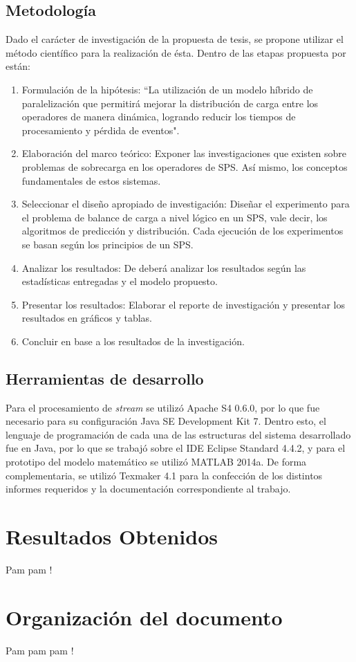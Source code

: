 \subsection{Metodología}
Dado el carácter de investigación de la propuesta de tesis, se propone utilizar el método científico para la realización de ésta. Dentro de las etapas propuesta por \citep{hernandez2010metodologia} están:

\begin{enumerate}
	\item Formulación de la hipótesis: ``La utilización de un modelo híbrido de paralelización que permitirá mejorar la distribución de carga entre los operadores de manera dinámica, logrando reducir los tiempos de procesamiento y pérdida de eventos".
	\item Elaboración del marco teórico: Exponer las investigaciones que existen sobre problemas de sobrecarga en los operadores de SPS. Así mismo, los conceptos fundamentales de estos sistemas.
	\item Seleccionar el diseño apropiado de investigación: Diseñar el experimento para el problema de balance de carga a nivel lógico en un SPS, vale decir, los algoritmos de predicción y distribución. Cada ejecución de los experimentos se basan según los principios de un SPS.
	\item Analizar los resultados: De deberá analizar los resultados según las estadísticas entregadas y el modelo propuesto.
	\item Presentar los resultados: Elaborar el reporte de investigación y presentar los resultados en gráficos y tablas.
	\item Concluir en base a los resultados de la investigación.
\end{enumerate}

\subsection{Herramientas de desarrollo}
Para el procesamiento de \textit{stream} se utilizó Apache S4 0.6.0, por lo que fue necesario para su configuración Java SE Development Kit 7. Dentro esto, el lenguaje de programación de cada una de las estructuras del sistema desarrollado fue en Java, por lo que se trabajó sobre el IDE Eclipse Standard 4.4.2, y para el prototipo del modelo matemático se utilizó MATLAB 2014a. De forma complementaria, se utilizó Texmaker 4.1 para la confección de los distintos informes requeridos y la documentación correspondiente al trabajo.

\section{Resultados Obtenidos}
\label{intro:resultados}
Pam pam !

\section{Organización del documento}
\label{intro:organizacion}
Pam pam pam !

